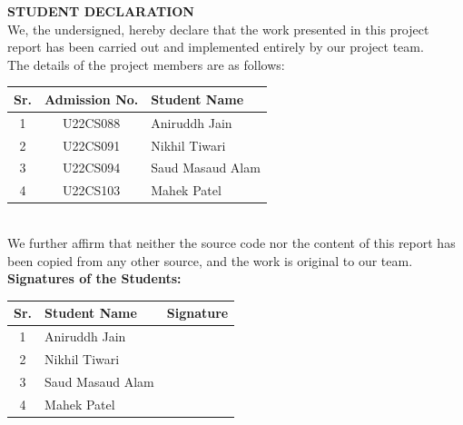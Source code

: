 \documentclass[12pt, a4paper]{report}
\begin{document}
\newpage
\thispagestyle{empty}

\vfill
\begin{center}
\begin{minipage}{0.85\textwidth}
    \centering
    
    {\Large \textbf{STUDENT DECLARATION}} \\[1.2cm]

    We, the undersigned, hereby declare that the work presented in this project report
    has been carried out and implemented entirely by our project team. \\[0.4cm]

    The details of the project members are as follows: \\[0.6cm]

    \renewcommand{\arraystretch}{1.15}
    \begin{tabular}{|c|c|p{7.5cm}|}
        \hline
        \textbf{Sr.} & \textbf{Admission No.} & \textbf{Student Name} \\
        \hline
        1 & U22CS088 & Aniruddh Jain \\
        \hline
        2 & U22CS091 & Nikhil Tiwari \\
        \hline
        3 & U22CS094 & Saud Masaud Alam \\
        \hline
        4 & U22CS103 & Mahek Patel \\
        \hline
    \end{tabular} \\[0.9cm]

    We further affirm that neither the source code nor the content of this report 
    has been copied from any other source, and the work is original to our team. \\[1.2cm]

    \textbf{Signatures of the Students:} \\[0.8cm]

    \begin{tabular}{|c|p{7cm}|c|}
        \hline
        \textbf{Sr.} & \centering \textbf{Student Name} & \textbf{Signature} \\
        \hline
        1 & Aniruddh Jain & \\[0.5cm] 
        \hline
        2 & Nikhil Tiwari & \\[0.5cm]
        \hline
        3 & Saud Masaud Alam & \\[0.5cm]
        \hline
        4 & Mahek Patel & \\[0.5cm]
        \hline
    \end{tabular}

\end{minipage}
\end{center}
\vfill
\end{document}
